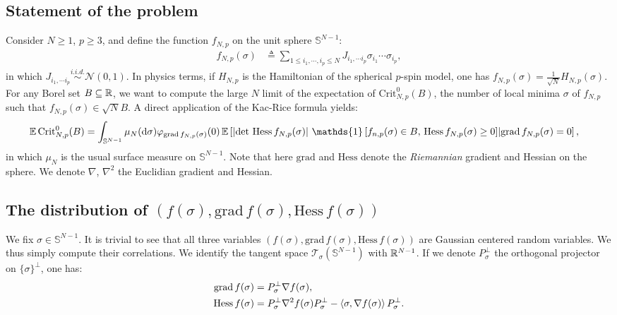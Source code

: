 \documentclass[amsmath,amssymb,nofootinbib,prd]{article}
\begin{document}
	\subsection{Statement of the problem}
	Consider $N \geq 1$, $p \geq 3$, and define the function $f_{N,p}$ on the unit sphere $\mathbb{S}^{N-1}$:
	\begin{align}
	f_{N,p}(\sigma) &\triangleq \sum_{1 \leq i_1,\cdots,i_p \leq N} J_{i_1,\cdots i_p} \sigma_{i_1} \cdots \sigma_{i_p},
	\end{align}
	in which $J_{i_1,\cdots i_p} \overset{i.i.d.}{\sim} \mathcal{N}(0,1)$. In physics terms, if $H_{N,p}$ is the Hamiltonian of the spherical $p$-spin model, one has $f_{N,p}(\sigma) = \frac{1}{\sqrt{N}} H_{N,p}(\sigma)$.  For any Borel set $B \subseteq \mathbb{R}$, we want to compute the large $N$ limit of the expectation of $\mathrm{Crit}_{N,p}^0(B)$, the number of local minima $\sigma$ of $f_{N,p}$ such that $f_{N,p}(\sigma) \in \sqrt{N} B$. 
	A direct application of the Kac-Rice formula yields:
	\begin{align*}
	\EE \, \mathrm{Crit}_{N,p}^0(B) &= \int_{\mathbb{S}^{N-1}} \mu_N(\mathrm{d}\sigma) \varphi_{\mathrm{grad}\, f_{N,p}(\sigma)}(0) \, \EE \left[\left|\det \, \mathrm{Hess}\, f_{N,p}(\sigma)\right| \, \mathds{1}\left[f_{n,p}(\sigma) \in B,\, \mathrm{Hess}\, f_{N,p}(\sigma) \geq 0\right] \middle| \mathrm{grad}\, f_{N,p}(\sigma) = 0 \right],
	\end{align*}
in which $\mu_N$ is the usual surface measure on $\mathbb{S}^{N-1}$. Note that here $\mathrm{grad}$ and $\mathrm{Hess}$ denote the \emph{Riemannian} gradient and Hessian on the sphere. We denote $\nabla$, $\nabla^2$ the Euclidian gradient and Hessian. 
	
	\subsection{The distribution of $(f(\sigma),\mathrm{grad}\, f(\sigma),\mathrm{Hess}\, f(\sigma))$}
	
	We fix $\sigma  \in \mathbb{S}^{N-1}$. It is trivial to see that all three variables $(f(\sigma),\mathrm{grad}\, f(\sigma),\mathrm{Hess}\, f(\sigma))$ are Gaussian centered random variables. We thus simply compute their correlations. We identify the tangent space $\mathcal{T}_\sigma(\mathbb{S}^{N-1})$ with $\mathbb{R}^{N-1}$. If we denote $P_\sigma^\perp$ the orthogonal projector on $\{\sigma\}^\perp$, one has:
	\begin{align}
	\mathrm{grad}\, f(\sigma) &= P_\sigma^\perp \nabla f(\sigma), \\
	\mathrm{Hess}\, f(\sigma) &= P_\sigma^\perp \nabla^2 f(\sigma) P_{\sigma}^\perp - \braket{\sigma,\nabla f(\sigma)} P_\sigma^\perp.
	\end{align}
	
\end{document}
